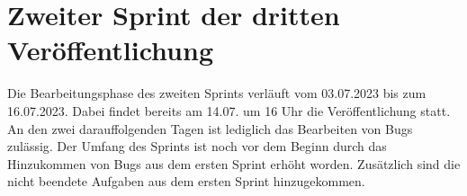 \section{Zweiter Sprint der dritten Veröffentlichung}
Die Bearbeitungsphase des zweiten Sprints verläuft vom 03.07.2023 bis zum 16.07.2023. Dabei findet bereits am 14.07. um 16 Uhr die Veröffentlichung statt. An den zwei darauffolgenden Tagen ist lediglich das Bearbeiten von Bugs zulässig. Der Umfang des Sprints ist noch vor dem Beginn durch das Hinzukommen von Bugs aus dem ersten Sprint erhöht worden. Zusätzlich sind die nicht beendete Aufgaben aus dem ersten Sprint hinzugekommen.



